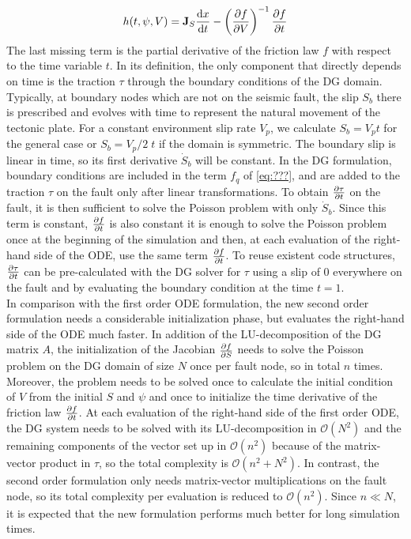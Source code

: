 \begin{equation}
	h(t,\psi,V) = \mathbf{J}_{S}\dv{x}{t} -\left(\pdv{f}{V}\right)^{-1}\pdv{f}{t}
\end{equation}
The last missing term is the partial derivative of the friction law $f$ with respect to the time variable $t$. In its definition, the only component that directly depends on time is the traction $\tau$ through the boundary conditions of the DG domain. Typically, at boundary nodes which are not on the seismic fault, the slip $S_b$ there is prescribed and evolves with time to represent the natural movement of the tectonic plate. For a constant environment slip rate $V_p$, we calculate $S_b=V_pt$ for the general case or $S_b=V_p/2\;t$ if the domain is symmetric. The boundary slip is linear in time, so its first derivative $\dot{S}_b$ will be constant. In the DG formulation, boundary conditions are included in the term $f_q$ of \autoref{eq:???}, and are added to the traction $\tau$ on the fault only after linear transformations. To obtain $\pdv{\tau}{t}$ on the fault, it is then sufficient to solve the Poisson problem with only $\dot{S}_b$. Since this term is constant, $\pdv{f}{t}$ is also constant it is enough to solve the Poisson problem once at the beginning of the simulation and then, at each evaluation of the right-hand side of the ODE, use the same term $\pdv{f}{t}$. To reuse existent code structures, $\pdv{\tau}{t}$ can be pre-calculated with the DG solver for $\tau$ using a slip of 0 everywhere on the fault and by evaluating the boundary condition at the time $t=1$. \\
In comparison with the first order ODE formulation, the new second order formulation needs a considerable initialization phase, but evaluates the right-hand side of the ODE much faster. In addition of the LU-decomposition of the DG matrix $A$, the initialization of the Jacobian $\pdv{f}{S}$ needs to solve the Poisson problem on the DG domain of size $N$ once per fault node, so in total $n$ times. Moreover, the problem needs to be solved once to calculate the initial condition of $V$ from the initial $S$ and $\psi$ and once to initialize the time derivative of the friction law $\pdv{f}{t}$. At each evaluation of the right-hand side of the first order ODE, the DG system needs to be solved with its LU-decomposition in $\mathcal{O}\left(N^2\right)$ and the remaining components of the vector set up in $\mathcal{O}\left(n^2\right)$ because of the matrix-vector product in $\tau$, so the total complexity is $\mathcal{O}\left(n^2+N^2\right)$. In contrast, the second order formulation only needs matrix-vector multiplications on the fault node, so its total complexity per evaluation is reduced to $\mathcal{O}\left(n^2\right)$. Since $n\ll N$, it is expected that the new formulation performs much better for long simulation times. \\
